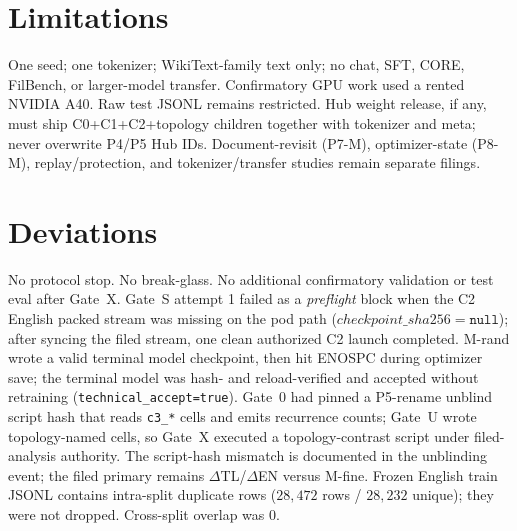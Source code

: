 \documentclass[11pt,a4paper]{article}
\begin{document}
\section{Limitations}
\label{sec:limit}

One seed; one tokenizer; WikiText-family text only; no chat, SFT, CORE, FilBench, or larger-model transfer. Confirmatory GPU work used a rented NVIDIA A40. Raw test JSONL remains restricted. Hub weight release, if any, must ship C0+C1+C2+topology children together with tokenizer and meta; never overwrite P4/P5 Hub IDs. Document-revisit (P7-M), optimizer-state (P8-M), replay/protection, and tokenizer/transfer studies remain separate filings.

\section{Deviations}
\label{sec:dev}

No protocol stop. No break-glass. No additional confirmatory validation or test eval after Gate~X. Gate~S attempt 1 failed as a \emph{preflight} block when the C2 English packed stream was missing on the pod path ($checkpoint\_sha256=\texttt{null}$); after syncing the filed stream, one clean authorized C2 launch completed. M-rand wrote a valid terminal model checkpoint, then hit ENOSPC during optimizer save; the terminal model was hash- and reload-verified and accepted without retraining (\texttt{technical\_accept=true}). Gate~0 had pinned a P5-rename unblind script hash that reads \texttt{c3\_*} cells and emits recurrence counts; Gate~U wrote topology-named cells, so Gate~X executed a topology-contrast script under filed-analysis authority. The script-hash mismatch is documented in the unblinding event; the filed primary remains $\Delta$TL/$\Delta$EN versus M-fine. Frozen English train JSONL contains intra-split duplicate rows ($28{,}472$ rows / $28{,}232$ unique); they were not dropped. Cross-split overlap was 0.
\end{document}
